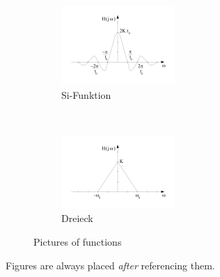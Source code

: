 \begin{figure}[htb]
	\centering
	\begin{subfigure}[b]{0.4\textwidth}
		\includegraphics[width=\textwidth]{figures/Si-function.png}
		\caption{Si-Funktion}
		\label{fig:si-function}
	\end{subfigure}
	~ %
	\begin{subfigure}[b]{0.4\textwidth}
		\includegraphics[width=\textwidth]{figures/dreieck.png}
		\caption{Dreieck}
		\label{fig:dreieck}
	\end{subfigure}
	\caption{Pictures of functions}
	\label{fig:functions}
\end{figure}

Figures are always placed \emph{after} referencing them.


